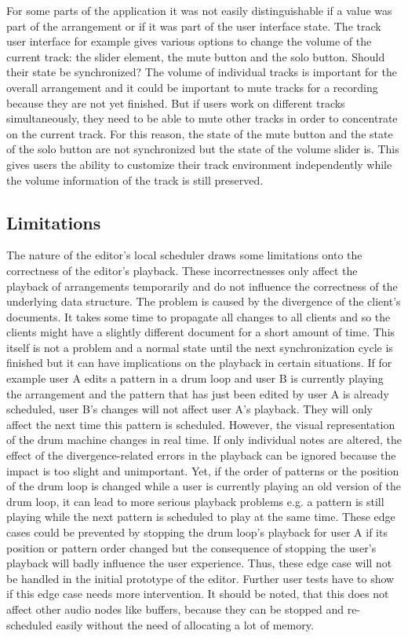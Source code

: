 For some parts of the application it was not easily distinguishable if a value was part of the arrangement or if it was part of the user interface state. The track user interface for example gives various options to change the volume of the current track: the slider element, the mute button and the solo button. Should their state be synchronized? The volume of individual tracks is important for the overall arrangement and it could be important to mute tracks for a recording because they are not yet finished. But if users work on different tracks simultaneously, they need to be able to mute other tracks in order to concentrate on the current track. For this reason, the state of the mute button and the state of the solo button are not synchronized but the state of the volume slider is. This gives users the ability to customize their track environment independently while the volume information of the track is still preserved.

\subsection{Limitations}

The nature of the editor's local scheduler draws some limitations onto the correctness of the editor's playback. These incorrectnesses only affect the playback of arrangements temporarily and do not influence the correctness of the underlying data structure. The problem is caused by the divergence of the client's documents. It takes some time to propagate all changes to all clients and so the clients might have a slightly different document for a short amount of time. This itself is not a problem and a normal state until the next synchronization cycle is finished but it can have implications on the playback in certain situations. If for example user A edits a pattern in a drum loop and user B is currently playing the arrangement and the pattern that has just been edited by user A is already scheduled, user B's changes will not affect user A's playback. They will only affect the next time this pattern is scheduled. However, the visual representation of the drum machine changes in real time. If only individual notes are altered, the effect of the divergence-related errors in the playback can be ignored because the impact is too slight and unimportant. Yet, if the order of patterns or the position of the drum loop is changed while a user is currently playing an old version of the drum loop, it can lead to more serious playback problems e.g. a pattern is still playing while the next pattern is scheduled to play at the same time. These edge cases could be prevented by stopping the drum loop's playback for user A if its position or pattern order changed but the consequence of stopping the user's playback will badly influence the user experience. Thus, these edge case will not be handled in the initial prototype of the editor. Further user tests have to show if this edge case needs more intervention. It should be noted, that this does not affect other audio nodes like buffers, because they can be stopped and re-scheduled easily without the need of allocating a lot of memory.

